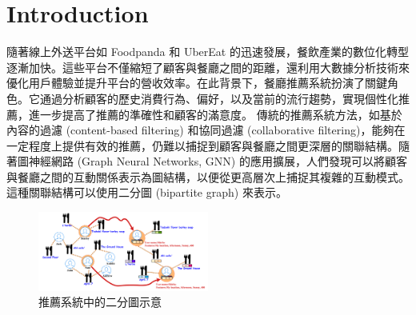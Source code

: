 \section{Introduction}
\label{sec:intro}

隨著線上外送平台如 Foodpanda 和 UberEat 的迅速發展，餐飲產業的數位化轉型逐漸加快。這些平台不僅縮短了顧客與餐廳之間的距離，還利用大數據分析技術來優化用戶體驗並提升平台的營收效率。在此背景下，餐廳推薦系統扮演了關鍵角色。它通過分析顧客的歷史消費行為、偏好，以及當前的流行趨勢，實現個性化推薦，進一步提高了推薦的準確性和顧客的滿意度。
傳統的推薦系統方法，如基於內容的過濾 (content-based filtering) 和協同過濾 (collaborative filtering)，能夠在一定程度上提供有效的推薦，仍難以捕捉到顧客與餐廳之間更深層的關聯結構。隨著圖神經網路 (Graph Neural Networks, GNN) 的應用擴展，人們發現可以將顧客與餐廳之間的互動關係表示為圖結構，以便從更高層次上捕捉其複雜的互動模式。這種關聯結構可以使用二分圖 (bipartite graph) 來表示。

\begin{figure}[tbh]
    \centering
    \includegraphics[width=0.5\textwidth]{img/bipartite_graph.pdf}
    \caption{推薦系統中的二分圖示意~\cite{bipratite_fig}}
    \label{fig-bipartite}
    \vspace{-0.35cm}
\end{figure}

